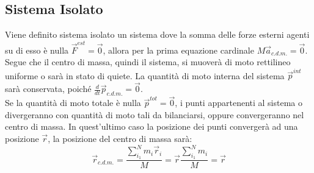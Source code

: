 \documentclass{article}
\numberwithin{equation}{subsection}
\begin{document}
\subsection{Sistema Isolato}
Viene definito sistema isolato un sistema dove la somma delle 
forze esterni agenti su di esso è nulla $\vec{F}^{est}=\vec{0}$, 
allora per la prima equazione cardinale $M\vec{a}_{c.d.m.}=\vec{0}$. 
Segue che il centro di massa, quindi il sistema, si muoverà di moto rettilineo 
uniforme o sarà in stato di quiete. La quantità di moto interna del sistema $\vec{p}^{int}$ 
sarà conservata, poiché $\displaystyle\frac{d}{dt}\vec{p}_{c.d.m.}=\vec{0}$.
\\
Se la quantità di moto totale è nulla $\vec{p}^{tot}=\vec{0}$, 
i punti appartenenti al sistema o divergeranno con quantità di 
moto tali da bilanciarsi, oppure convergeranno nel centro di 
massa. In quest'ultimo caso la posizione dei punti convergerà 
ad una posizione $\vec{r}$, la posizione del centro di massa sarà:
\begin{equation}
    \vec{r}_{c.d.m.}=\displaystyle\frac{\sum_{i_1}^{N}m_i\vec{r}_i}{M}=\vec{r}\frac{\sum_{i_1}^{N}m_i}{M}=\vec{r}
\end{equation}
\end{document}

